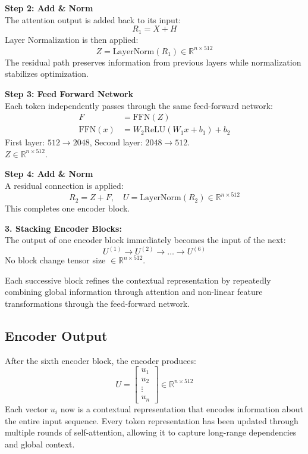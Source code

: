 \textbf{Step 2: Add \& Norm} \\
The attention output is added back to its input:
\begin{equation}
R_1 = X + H
\end{equation}
Layer Normalization is then applied:
\begin{equation}
Z = \text{LayerNorm}(R_1) \in \mathbb{R}^{n \times 512}
\end{equation}
The residual path preserves information from previous layers while normalization stabilizes optimization.

\textbf{Step 3: Feed Forward Network} \\
Each token independently passes through the same feed-forward network:
\begin{align}
F &= \text{FFN}(Z) \\
\text{FFN}(x) &= W_2 \text{ReLU}(W_1 x + b_1) + b_2
\end{align}
First layer: $512 \to 2048$, Second layer: $2048 \to 512$. \\
$Z \in \mathbb{R}^{n \times 512}$.

\textbf{Step 4: Add \& Norm} \\
A residual connection is applied:
\begin{equation}
R_2 = Z + F, \quad U = \text{LayerNorm}(R_2) \in \mathbb{R}^{n \times 512}
\end{equation}
This completes one encoder block.

\textbf{3. Stacking Encoder Blocks:} \\
The output of one encoder block immediately becomes the input of the next:
\begin{equation}
U^{(1)} \to U^{(2)} \to \dots \to U^{(6)}
\end{equation}
No block change tensor size $\in \mathbb{R}^{n \times 512}$.

Each successive block refines the contextual representation by repeatedly combining global information through attention and non-linear feature transformations through the feed-forward network.

\subsection{Encoder Output}
After the sixth encoder block, the encoder produces:
\begin{equation}
U = \begin{bmatrix} u_1 \\ u_2 \\ \vdots \\ u_n \end{bmatrix} \in \mathbb{R}^{n \times 512}
\end{equation}
Each vector $u_i$ now is a contextual representation that encodes information about the entire input sequence. Every token representation has been updated through multiple rounds of self-attention, allowing it to capture long-range dependencies and global context.


